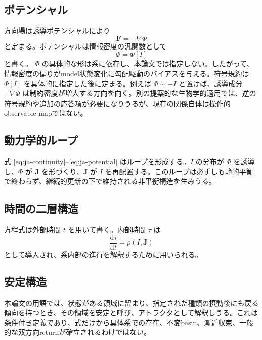 \documentclass[11pt]{ltjsarticle}
\newcommand{\I}{I}
\newcommand{\J}{\mathbf{J}}
\newcommand{\PhiI}{\Phi}
\newcommand{\dd}{\mathrm{d}}
\begin{document}
\subsection{ポテンシャル}

方向場は誘導ポテンシャルにより
\begin{equation}
  \mathbf{F}=-\nabla\PhiI
  \label{eq:ja-force}
\end{equation}
と定まる。ポテンシャルは情報密度の汎関数として
\begin{equation}
  \PhiI=\PhiI[\I]
  \label{eq:ja-potential}
\end{equation}
と書く。 \(\PhiI\) の具体的な形は系に依存し、本論文では指定しない。したがって、情報密度の偏りがmodel状態変化に勾配駆動のバイアスを与える。符号規約は \(\PhiI[\I]\) を具体的に指定した後に定まる。例えば \(\PhiI\sim-\I\) と置けば、誘導成分 \(-\nabla\PhiI\) は制約密度が増大する方向を向く。別の提案的な生物学的適用では、逆の符号規約や追加の応答項が必要になりうるが、現在の関係自体は操作的observable mapではない。

\subsection{動力学的ループ}

式 \eqref{eq:ja-continuity}--\eqref{eq:ja-potential} はループを形成する。\(\I\) の分布が \(\PhiI\) を誘導し、\(\PhiI\) が \(\J\) を形づくり、\(\J\) が \(\I\) を再配置する。このループは必ずしも静的平衡で終わらず、継続的更新の下で維持される非平衡構造を生みうる。

\subsection{時間の二層構造}

方程式は外部時間 \(t\) を用いて書く。内部時間 \(\tau\) は
\begin{equation}
  \frac{\dd \tau}{\dd t}=\rho(\I,\J)
\end{equation}
として導入され、系内部の進行を解釈するために用いられる。

\subsection{安定構造}

本論文の用語では、状態がある領域に留まり、指定された種類の摂動後にも戻る傾向を持つとき、その領域を安定と呼び、アトラクタとして解釈しうる。これは条件付き定義であり、式だけから具体系での存在、不変basin、漸近収束、一般的な双方向returnが確立されるわけではない。
\end{document}
